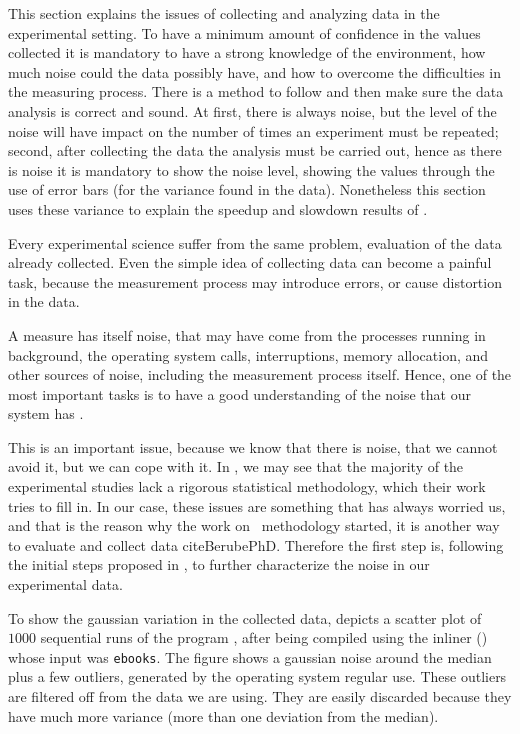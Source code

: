 
This section explains the issues of collecting and analyzing data in the experimental setting. To have a minimum amount of confidence in the values collected it is mandatory to have a strong knowledge of the environment, how much noise could the data possibly have, and how to overcome the difficulties in the measuring process. There is a method to follow and then make sure the data analysis is correct and sound. At first, there is always noise, but the level of the noise will have impact on the number of times an experiment must be repeated; second, after collecting the data the analysis must be carried out, hence as there is noise it is mandatory to show the noise level, showing the values through the use of error bars (for the variance found in the data). Nonetheless this section uses these variance to explain the speedup and slowdown results of .

Every experimental science suffer from the same problem, evaluation of the data already collected. Even the simple idea of collecting data can become a painful task, because the measurement process may introduce errors, or cause distortion in the data.

A measure has itself noise, that may have come from the processes running in background, the operating system calls, interruptions, memory allocation, and other sources of noise, including the measurement process itself. Hence, one of the most important tasks is to have a good understanding of the noise that our system has \cite{Kalibera2013}.

This is an important issue, because we know that there is noise, that we cannot avoid it, but we can cope with it. In \cite{Kalibera2013}, we may see that the majority of the experimental studies lack a rigorous statistical methodology, which their work tries to fill in. In our case, these issues are something that has always worried us, and that is the reason why the work on \CP\ methodology started, it is another way to evaluate and collect data cite{BerubePhD}. Therefore the first step is, following the initial steps proposed in \cite{Kalibera2013}, to further characterize the noise in our experimental data.

To show the gaussian variation in the collected data,  depicts a scatter plot of $1000$ sequential runs of the program \bzip, after being compiled using the  inliner (\llvm) whose input was {\tt ebooks}. The figure shows a gaussian noise around the median plus a few outliers, generated by the operating system regular use. These outliers are filtered off from the data we are using. They are easily discarded because they have much more variance (more than one deviation from the median).

